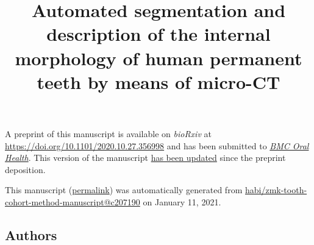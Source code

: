 \documentclass[
  american,
]{article}
\title{Automated segmentation and description of the internal morphology of human permanent teeth by means of micro-CT}
\author{}
\date{}
\begin{document}
\maketitle

A preprint of this manuscript is available on \emph{bioRxiv} at \url{https://doi.org/10.1101/2020.10.27.356998} and has been submitted to \href{https://bmcoralhealth.biomedcentral.com/}{\emph{BMC Oral Health}}.
This version of the manuscript \href{https://github.com/habi/zmk-tooth-cohort-method-manuscript/compare/f9b3333c625228f4f28211a34f381b9f87c430b0...c207190574a67d3ccfd31e91a7e5f576d32f7261}{has been updated} since the preprint deposition.

This manuscript
(\href{https://habi.github.io/zmk-tooth-cohort-method-manuscript/v/c207190574a67d3ccfd31e91a7e5f576d32f7261/}{permalink})
was automatically generated
from \href{https://github.com/habi/zmk-tooth-cohort-method-manuscript/tree/c207190574a67d3ccfd31e91a7e5f576d32f7261}{habi/zmk-tooth-cohort-method-manuscript@c207190}
on January 11, 2021.

\hypertarget{authors}{%
\subsection{Authors}\label{authors}}
\end{document}
